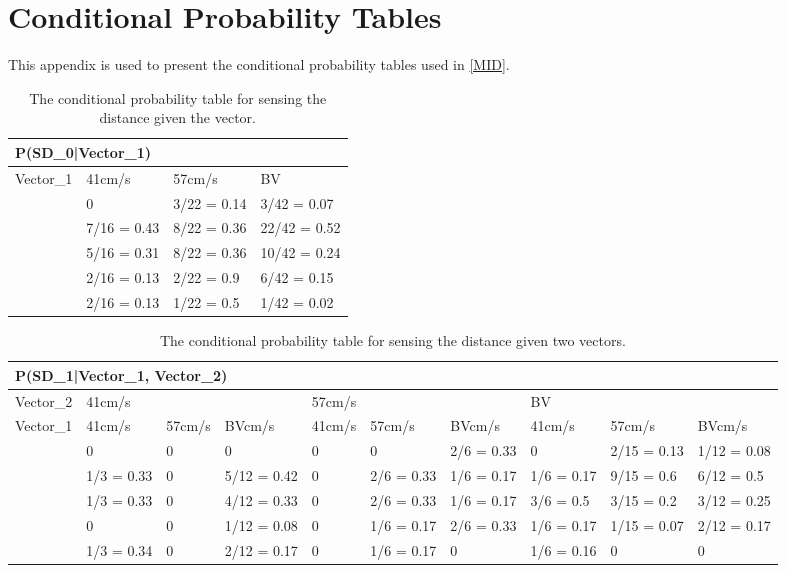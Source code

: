 \chapter{Conditional Probability Tables}\label{AppProbTabs}
This appendix is used to present the conditional probability tables used in \autoref{MID}.

\begin{table}[H]
\centering
\begin{tabular}{|l|l|l|l|}
\hline
\multicolumn{4}{|l|}{P(SD\_0|Vector\_1)} \\ \hline
Vector\_1     & 41cm/s & 57cm/s & BV \\\hline 
[0 - 60]      & 0       & 3/22 = 0.14 & 3/42 = 0.07\\ \hline 
[60 - 75]    & 7/16 = 0.43 & 8/22 = 0.36 & 22/42 = 0.52\\ \hline
[75 - 90]   & 5/16 = 0.31 & 8/22 = 0.36 & 10/42 = 0.24\\ \hline
[90 - 105]   & 2/16 = 0.13 & 2/22 = 0.9 & 6/42 = 0.15\\ \hline
[105 - 255]   & 2/16 = 0.13& 1/22 = 0.5 & 1/42 = 0.02 \\ \hline
\end{tabular}
\caption{The conditional probability table for sensing the distance given the
vector.}
\label{SDtable}
\end{table}

\begin{table}[H]
\centering
\begin{tabular}{|l|p{1.2cm}|p{1.2cm}|l|p{1.2cm}|p{1.2cm}|p{1.2cm}|l|p{1.2cm}|p{1.2cm}|}
\hline
\multicolumn{10}{|l|}{P(SD\_1|Vector\_1, Vector\_2)} \\\hline
Vector\_2 & \multicolumn{3}{l|}{41cm/s} & \multicolumn{3}{l|}{57cm/s} &
\multicolumn{3}{l|}{BV}\\\hline
Vector\_1 & 41cm/s      &  57cm/s     & BVcm/s      & 41cm/s      & 57cm/s     
& BVcm/s & 41cm/s & 57cm/s & BVcm/s \\\hline
[0-60]& 0 & 0 & 0 & 0 & 0 & 2/6 = 0.33& 0 & 2/15 = 0.13 & 1/12 = 0.08 \\\hline
[60-75]& 1/3 = 0.33 & 0 & 5/12 = 0.42 & 0 & 2/6 = 0.33 & 1/6 = 0.17 & 1/6 = 0.17
& 9/15 = 0.6 & 6/12 = 0.5\\ \hline
[75-90] & 1/3 = 0.33 & 0 & 4/12 = 0.33 & 0 & 2/6 = 0.33 & 1/6 = 0.17 & 3/6 =
0.5 & 3/15 = 0.2 &3/12 = 0.25\\\hline
[90-105] & 0 & 0 & 1/12 = 0.08 & 0 & 1/6 = 0.17 & 2/6 = 0.33 & 1/6 = 0.17
& 1/15 = 0.07 & 2/12 = 0.17\\\hline
[105-255] & 1/3 = 0.34 & 0 & 2/12 = 0.17& 0 & 1/6 = 0.17 & 0 & 1/6 = 0.16 & 0
&0\\\hline
\end{tabular}
\caption{The conditional probability table for sensing the distance given two
vectors.}
\label{SDtable2}
\end{table}

